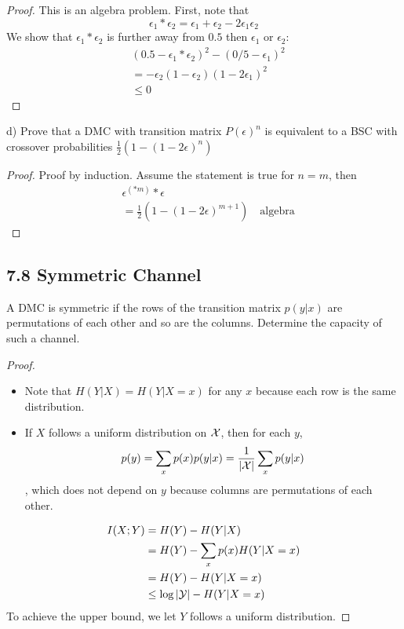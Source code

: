 \documentclass[../main.tex]{subfiles}
\begin{document}
\begin{proof}
    This is an algebra problem. First, note that \[
    \epsilon_1 * \epsilon_2 = \epsilon_1 + \epsilon_2 -2\epsilon_1\epsilon_2
    \]
    We show that $\epsilon_1 * \epsilon_2$ is further away from $0.5$ then $\epsilon_1$ or $\epsilon_2$: \begin{align*}
        &(0.5-\epsilon_1 * \epsilon_2)^2-(0/5-\epsilon_1)^2\\
        &=-\epsilon_2(1-\epsilon_2 )(1-2\epsilon_1)^2\\
        &\leq 0
    \end{align*}
\end{proof}
d) Prove that a DMC with transition matrix $P(\epsilon)^n$ is equivalent to a BSC with crossover probabilities $\frac{1}{2}(1-(1-2\epsilon)^n)$
\begin{proof}
    Proof by induction. Assume the statement is true for $n=m$, then \begin{align*}
        &\epsilon^{(*m)}*\epsilon\\
        &=\frac{1}{2}(1-(1-2\epsilon)^{m+1}) \quad \text{algebra}
    \end{align*}
\end{proof}
\subsection*{7.8 Symmetric Channel} A DMC is symmetric if the rows of the transition matrix $p(y|x)$ are permutations of each other and so are the columns. Determine the capacity of such a channel.
\begin{proof}
    \begin{itemize}
        \item Note that $H(Y|X)=H(Y|X=x)$ for any $x$ because each row is the same distribution.
        \item If $X$ follows a uniform distribution on $\mathcal{X}$, then for each $y$, \[
        p(y)=\sum_xp(x)p(y|x)=\frac{1}{|\mathcal{X}|}\sum_xp(y|x)
        \], which does not depend on $y$ because columns are permutations of each other. 
    \end{itemize}
    \begin{align*}
       I(X;Y)&=H(Y)-H(Y|X)\\
       &=H(Y)-\sum_xp(x)H(Y|X=x)\\
       &=H(Y)-H(Y|X=x)\\
       &\leq \log|\mathcal{Y}|-H(Y|X=x)
    \end{align*}
    To achieve the upper bound, we let $Y$ follows a uniform distribution.
\end{proof}
\end{document}
